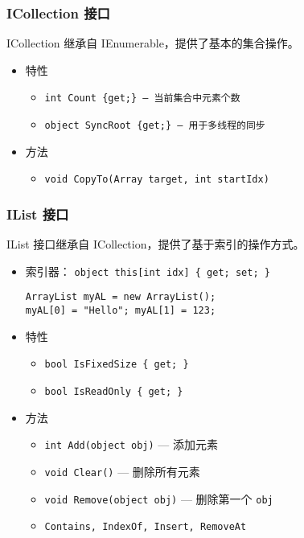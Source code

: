 \begin{frame}
\frametitle{ICollection 接口}
ICollection 继承自 IEnumerable，提供了基本的集合操作。
\begin{itemize}
\setlength{\itemsep}{8pt plus 1pt}
\item 特性
\begin{itemize}
\setlength{\itemsep}{6pt plus 1pt}
\item \texttt{int Count \{get;\} --- 当前集合中元素个数}
\item \texttt{object SyncRoot \{get;\} --- 用于多线程的同步}
\end{itemize}
\item 方法
\begin{itemize}
\item \texttt{void CopyTo(Array target, int startIdx)}
\end{itemize}
\end{itemize}
\end{frame}

\begin{frame}[fragile]
\frametitle{IList 接口}
IList 接口继承自 ICollection，提供了基于索引的操作方式。
\begin{itemize}
\item 索引器： \texttt{object this[int idx] \{ get; set; \}}
\begin{lstlisting}
ArrayList myAL = new ArrayList();
myAL[0] = "Hello"; myAL[1] = 123;
\end{lstlisting}
\item 特性
\begin{itemize}
\item \texttt{bool IsFixedSize \{ get; \}}
\item \texttt{bool IsReadOnly \{ get; \}}
\end{itemize}
\item 方法
\begin{itemize}
\item \texttt{int Add(object obj)} --- 添加元素
\item \texttt{void Clear()} --- 删除所有元素
\item \texttt{void Remove(object obj)} --- 删除第一个 \texttt{obj}
\item \texttt{Contains, IndexOf, Insert, RemoveAt}
\end{itemize}
\end{itemize}
\end{frame}

